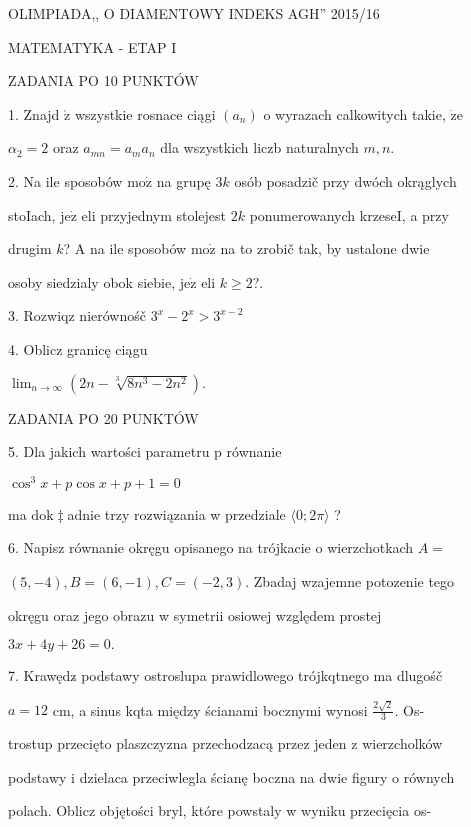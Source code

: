 \documentclass[a4paper,12pt]{article}
\begin{document}
OLIMPIADA,, O DIAMENTOWY INDEKS AGH'' 2015/16

MATEMATYKA - ETAP I

ZADANIA PO 10 PUNKTÓW

1. Znajd $\acute{\mathrm{z}}$ wszystkie rosnace ciągi $(a_{n})$ o wyrazach calkowitych takie, $\dot{\mathrm{z}}\mathrm{e}$

$\alpha_{2}=2$ oraz $a_{mn}=a_{m}a_{n}$ dla wszystkich liczb naturalnych $m, n.$

2. Na ile sposobów $\mathrm{m}\mathrm{o}\dot{\mathrm{z}}$ na grupę $3k$ osób posadzič przy dwóch okrąglych

stoIach, $\mathrm{j}\mathrm{e}\dot{\mathrm{z}}$ eli przyjednym stolejest $2k$ ponumerowanych krzeseI, a przy

drugim $k$? A na ile sposobów $\mathrm{m}\mathrm{o}\dot{\mathrm{z}}$ na to zrobič tak, by ustalone dwie

osoby siedzialy obok siebie, $\mathrm{j}\mathrm{e}\dot{\mathrm{z}}$ eli $k\geq 2?.$

3. Rozwiqz nierównośč $3^{x}-2^{x}>3^{x-2}$

4. Oblicz granicę ciągu

$\displaystyle \lim_{n\rightarrow\infty}(2n-\sqrt[3]{8n^{3}-2n^{2}}).$

ZADANIA PO 20 PUNKTÓW

5. Dla jakich wartości parametru p równanie

$\cos^{3}x+p\cos x+p+1=0$

ma $\mathrm{d}\mathrm{o}\mathrm{k}\ddagger$adnie trzy rozwiązania w przedziale $\langle 0;2\pi\rangle$ ?

6. Napisz równanie okręgu opisanego na trójkacie o wierzchotkach $A =$

$(5,-4), B = (6,-1), C= (-2,3)$. Zbadaj wzajemne potozenie tego

okręgu oraz jego obrazu w symetrii osiowej względem prostej

$3x+4y+26=0.$

7. Krawędz$\acute{}$ podstawy ostroslupa prawidlowego trójkqtnego ma dlugośč

$a= 12$ cm, a sinus kqta między ścianami bocznymi wynosi $\displaystyle \frac{2\sqrt{2}}{3}$. Os-

trostup przecięto plaszczyzna przechodzacą przez jeden z wierzcholków

podstawy i dzielaca przeciwlegla ścianę boczna na dwie figury o równych

polach. Oblicz objętości bryl, które powstaly w wyniku przecięcia os-
\end{document}
